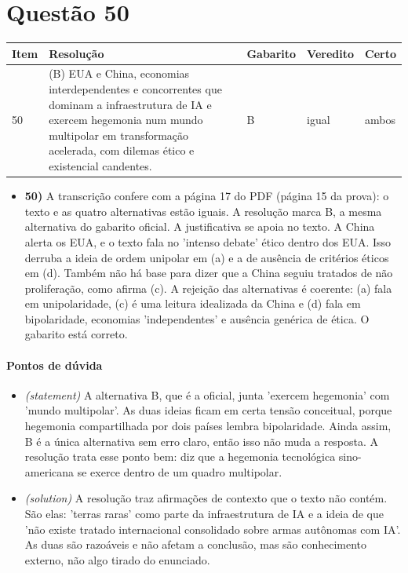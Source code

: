 \documentclass{article}%
\begin{document}
\section*{Questão 50}%
\begin{longtable}{@{}p{} p{} p{} p{} p{}@{}}\toprule Item & Resolução & Gabarito & Veredito & Certo \\ \midrule
50 & (B) EUA e China, economias interdependentes e concorrentes que dominam a infraestrutura de IA e exercem hegemonia num mundo multipolar em transformação acelerada, com dilemas ético e existencial candentes. & B & igual & ambos \\
\bottomrule\end{longtable}%
\begin{itemize}%
\item%
\textbf{50)} A transcrição confere com a página 17 do PDF (página 15 da prova): o texto e as quatro alternativas estão iguais. A resolução marca B, a mesma alternativa do gabarito oficial. A justificativa se apoia no texto. A China alerta os EUA, e o texto fala no 'intenso debate' ético dentro dos EUA. Isso derruba a ideia de ordem unipolar em (a) e a de ausência de critérios éticos em (d). Também não há base para dizer que a China seguiu tratados de não proliferação, como afirma (c). A rejeição das alternativas é coerente: (a) fala em unipolaridade, (c) é uma leitura idealizada da China e (d) fala em bipolaridade, economias 'independentes' e ausência genérica de ética. O gabarito está correto.%
\end{itemize}%
\paragraph{Pontos de dúvida}%
\begin{itemize}%
\item%
\textit{(statement)} A alternativa B, que é a oficial, junta 'exercem hegemonia' com 'mundo multipolar'. As duas ideias ficam em certa tensão conceitual, porque hegemonia compartilhada por dois países lembra bipolaridade. Ainda assim, B é a única alternativa sem erro claro, então isso não muda a resposta. A resolução trata esse ponto bem: diz que a hegemonia tecnológica sino{-}americana se exerce dentro de um quadro multipolar.%
\item%
\textit{(solution)} A resolução traz afirmações de contexto que o texto não contém. São elas: 'terras raras' como parte da infraestrutura de IA e a ideia de que 'não existe tratado internacional consolidado sobre armas autônomas com IA'. As duas são razoáveis e não afetam a conclusão, mas são conhecimento externo, não algo tirado do enunciado.%
\end{itemize}%
\end{document}
